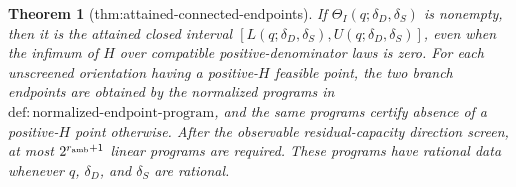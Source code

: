 \documentclass{article}
\newtheorem{theorem}{Theorem}
\begin{document}
\begin{theorem}[thm:attained-connected-endpoints]\label{thm:attained-connected-endpoints}
If \(\Theta_I(q;\delta_D,\delta_S)\) is nonempty, then it is the attained closed interval \([L(q;\delta_D,\delta_S),U(q;\delta_D,\delta_S)]\), even when the infimum of \(H\) over compatible positive-denominator laws is zero.  For each unscreened orientation having a positive-\(H\) feasible point, the two branch endpoints are obtained by the normalized programs in \(\mathrm{def:normalized\text{-}endpoint\text{-}program}\), and the same programs certify absence of a positive-\(H\) point otherwise.  After the observable residual-capacity direction screen, at most \(2^{r_{\rm amb}+1}\) linear programs are required.  These programs have rational data whenever \(q\), \(\delta_D\), and \(\delta_S\) are rational.
\end{theorem}
\end{document}
